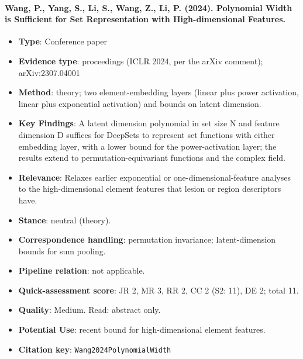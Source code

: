 \documentclass[journal,onecolumn]{IEEEtran}
\begin{document}
\paragraph{Wang, P., Yang, S., Li, S., Wang, Z., Li, P. (2024). Polynomial Width is Sufficient for Set Representation with High-dimensional Features.~\cite{Wang2024PolynomialWidth}}\mbox{}

\begin{itemize}

\item{} \textbf{Type}: Conference paper

\item{} \textbf{Evidence type}: proceedings (ICLR 2024, per the arXiv comment); arXiv:2307.04001

\item{} \textbf{Method}: theory; two element-embedding layers (linear plus power activation, linear plus exponential activation) and bounds on latent dimension.

\item{} \textbf{Key Findings}: A latent dimension polynomial in set size N and feature dimension D suffices for DeepSets to represent set functions with either embedding layer, with a lower bound for the power-activation layer; the results extend to permutation-equivariant functions and the complex field.

\item{} \textbf{Relevance}: Relaxes earlier exponential or one-dimensional-feature analyses to the high-dimensional element features that lesion or region descriptors have.

\item{} \textbf{Stance}: neutral (theory).

\item{} \textbf{Correspondence handling}: permutation invariance; latent-dimension bounds for sum pooling.

\item{} \textbf{Pipeline relation}: not applicable.

\item{} \textbf{Quick-assessment score}: JR 2, MR 3, RR 2, CC 2 (S2: 11), DE 2; total 11.

\item{} \textbf{Quality}: Medium. Read: abstract only.

\item{} \textbf{Potential Use}: recent bound for high-dimensional element features.

\item{} \textbf{Citation key}: \texttt{Wang2024PolynomialWidth}

\end{itemize}
\end{document}
